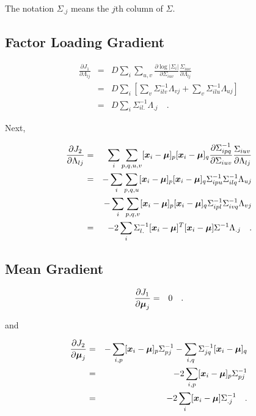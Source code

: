 \documentclass[12pt,preprint]{aastex}
\begin{document}
The notation $\Sigma_{.j}$ means the $j$th column of $\Sigma$.

\subsection{Factor Loading Gradient}

\begin{eqnarray}\displaystyle
\frac{\partial J_1}{\partial \Lambda_{lj}} &=& D\sum_i \sum_{u,v}
\frac{\partial \log|\Sigma_i|}{\partial
  \Sigma_{iuv}}\frac{\Sigma_{iuv}}{\partial \Lambda_{lj}} \\
&=& D \sum_i \left[\sum_v\Sigma^{-1}_{ilv}\Lambda_{vj} + \sum_v\Sigma^{-1}_{ilu}\Lambda_{uj}\right]\\
&=& D \sum_i \Sigma^{-1}_{il.}\Lambda_{.j}
\quad .
\label{eqn:lambda1}
\end{eqnarray}

Next,

\begin{eqnarray}\displaystyle
\frac{\partial J_2}{\partial \Lambda_{lj}} &=&  \sum_i \sum_{p,q,u,v}
[\boldsymbol{x}_i-\boldsymbol{\mu}]_p [\boldsymbol{x}_i-\boldsymbol{\mu}]_q\frac{\partial \Sigma^{-1}_{ipq}}{\partial
  \Sigma_{iuv}}\frac{\Sigma_{iuv}}{\partial \Lambda_{lj}} \\
&=& - \sum_i \sum_{p,q,u} [\boldsymbol{x}_i-\boldsymbol{\mu}]_p [\boldsymbol{x}_i-\boldsymbol{\mu}]_q
\Sigma^{-1}_{ipu}\Sigma^{-1}_{ilq}\Lambda_{uj} \\
&&  - \sum_i \sum_{p,q,v} [\boldsymbol{x}_i-\boldsymbol{\mu}]_p [\boldsymbol{x}_i-\boldsymbol{\mu}]_q
\Sigma^{-1}_{ipl}\Sigma^{-1}_{ivq}\Lambda_{vj} \\
&=& -2 \sum_i \Sigma_{l.}^{-1}[\boldsymbol{x}_i-\boldsymbol{\mu}]^T [\boldsymbol{x}_i-\boldsymbol{\mu}]\Sigma^{-1}\Lambda_{.j}
\quad .
\label{eqn:gradlambda2}
\end{eqnarray}

\subsection{Mean Gradient}

\begin{eqnarray}\displaystyle
\frac{\partial J_1}{\partial \boldsymbol{\mu}_{j}} &=&  0
\quad .
\label{eqn:gradmean1}
\end{eqnarray}

and 

\begin{eqnarray}\displaystyle
\frac{\partial J_2}{\partial \boldsymbol{\mu}_{j}} &=&  -\sum_{i,p}
[\boldsymbol{x}_i-\boldsymbol{\mu}]_p\Sigma_{pj}^{-1}  -\sum_{i,q}
\Sigma_{jq}^{-1} [\boldsymbol{x}_i-\boldsymbol{\mu}]_q \\
&=&  -2 \sum_{i,p} [\boldsymbol{x}_i-\boldsymbol{\mu}]_p\Sigma_{pj}^{-1} \\
&=& -2 \sum_i [\boldsymbol{x}_i-\boldsymbol{\mu}] \Sigma_{.j}^{-1}
\quad .
\label{eqn:gradmean2}
\end{eqnarray}
\end{document}
